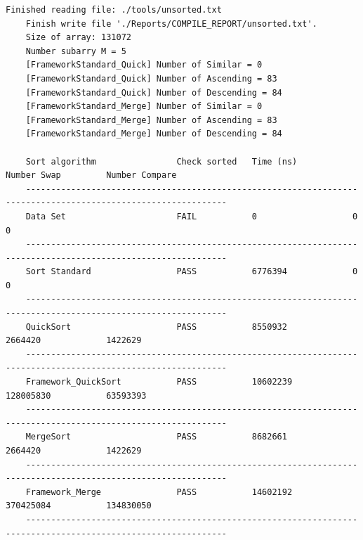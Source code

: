 \begin{lstlisting}[style=StyleResult, language=Result, basicstyle=\fontsize{6}{6}\selectfont\ttfamily, caption={Kết quả kiểm chứng khi chạy với $N = 2^{17}$.}]
	Finished reading file: ./tools/unsorted.txt
	Finish write file './Reports/COMPILE_REPORT/unsorted.txt'.
	Size of array: 131072
	Number subarry M = 5
	[FrameworkStandard_Quick] Number of Similar = 0
	[FrameworkStandard_Quick] Number of Ascending = 83
	[FrameworkStandard_Quick] Number of Descending = 84
	[FrameworkStandard_Merge] Number of Similar = 0
	[FrameworkStandard_Merge] Number of Ascending = 83
	[FrameworkStandard_Merge] Number of Descending = 84
	
	Sort algorithm                Check sorted   Time (ns)           Number Swap         Number Compare      
	--------------------------------------------------------------------------------------------------------------
	Data Set                      FAIL           0                   0                   0                   
	--------------------------------------------------------------------------------------------------------------
	Sort Standard                 PASS           6776394             0                   0                   
	--------------------------------------------------------------------------------------------------------------
	QuickSort                     PASS           8550932             2664420             1422629             
	--------------------------------------------------------------------------------------------------------------
	Framework_QuickSort           PASS           10602239            128005830           63593393            
	--------------------------------------------------------------------------------------------------------------
	MergeSort                     PASS           8682661             2664420             1422629             
	--------------------------------------------------------------------------------------------------------------
	Framework_Merge               PASS           14602192            370425084           134830050           
	--------------------------------------------------------------------------------------------------------------
\end{lstlisting}

